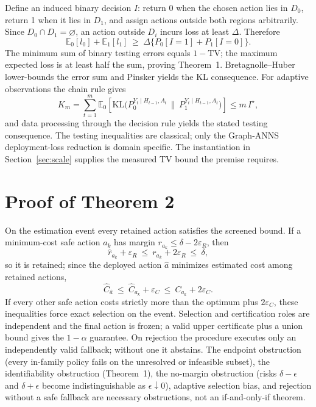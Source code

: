 \documentclass{article}
\newcommand{\TV}{\mathrm{TV}}
\newcommand{\KL}{\mathrm{KL}}
\newcommand{\E}{\mathbb{E}}
\begin{document}
Define an induced binary decision $I$: return 0 when the chosen action lies in $D_0$, return 1 when it lies
in $D_1$, and assign actions outside both regions arbitrarily. Since $D_0\cap D_1=\varnothing$, an action
outside $D_i$ incurs loss at least $\Delta$. Therefore
\begin{equation}
\E_{0}[l_{0}]+\E_{1}[l_{1}]\ \ge\ \Delta\bigl\{P_{0}[I{=}1]+P_{1}[I{=}0]\bigr\}.
\label{eq:proof1}
\end{equation}
The minimum sum of binary testing errors equals $1-\TV$; the maximum expected loss is at least half the sum,
proving Theorem~1. Bretagnolle--Huber lower-bounds the error sum and Pinsker yields the KL consequence.
For adaptive observations the chain rule gives
\begin{equation}
K_{m}=\sum_{t=1}^{m}\E_{0}\!\left[\KL\bigl(P_{0}^{Y_{t}\mid H_{t-1},A_{t}}\,\bigl\|\,P_{1}^{Y_{t}\mid H_{t-1},A_{t}}\bigr)\right]\le m\,I^{\star},
\label{eq:chain}
\end{equation}
and data processing through the decision rule yields the stated testing consequence. The testing
inequalities are classical; only the Graph-ANNS deployment-loss reduction is domain specific. The
instantiation in Section~\ref{sec:scale} supplies the measured TV bound the premise requires.

\section{Proof of Theorem 2}
\label{app:proof2}

On the estimation event every retained action satisfies the screened bound. If a minimum-cost safe action
$a_k$ has margin $r_{a_k}\le\delta-2\varepsilon_R$, then
\begin{equation}
\hat r_{a_{k}}+\varepsilon_{R}\ \le\ r_{a_{k}}+2\varepsilon_{R}\ \le\ \delta,
\label{eq:retain}
\end{equation}
so it is retained; since the deployed action $\hat a$ minimizes estimated cost among retained actions,
\begin{equation}
\hat C_{\hat a}\ \le\ \hat C_{a_{k}}+\varepsilon_{C}\ \le\ C_{a_{k}}+2\varepsilon_{C}.
\label{eq:cost}
\end{equation}
If every other safe action costs strictly more than the optimum plus $2\varepsilon_C$, these inequalities
force exact selection on the event. Selection and certification roles are independent and the final action
is frozen; a valid upper certificate plus a union bound gives the $1-\alpha$ guarantee. On rejection the
procedure executes only an independently valid fallback; without one it abstains. The endpoint obstruction
(every in-family policy fails on the unresolved or infeasible subset), the identifiability obstruction
(Theorem~1), the no-margin obstruction (risks $\delta-\epsilon$ and $\delta+\epsilon$ become
indistinguishable as $\epsilon\downarrow0$), adaptive selection bias, and rejection without a safe fallback
are necessary obstructions, not an if-and-only-if theorem.
\end{document}
